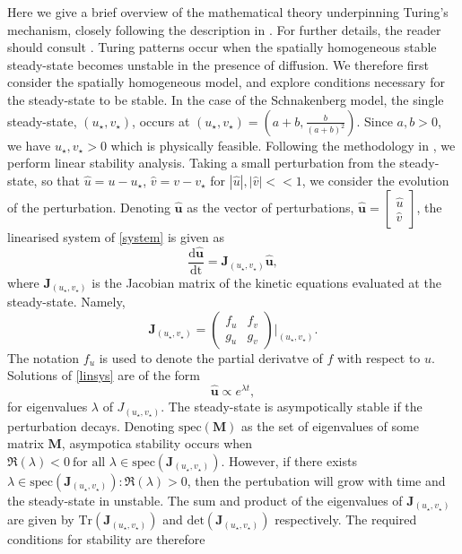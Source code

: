 \documentclass[12pt]{report}
\begin{document}
Here we give a brief overview of the mathematical theory underpinning Turing's mechanism, closely following the description in \cite{murray}. For further details, the reader should consult \cite{murray,beentjes}. Turing patterns occur when the spatially homogeneous stable steady-state becomes unstable in the presence of diffusion. We therefore first consider the spatially homogeneous model, and explore conditions necessary for the steady-state to be stable. In the case of the Schnakenberg model, the single steady-state, $(u_\star, v_\star)$, occurs at $(u_\star, v_\star)=\left(a+b, \frac{b}{(a+b)^2}\right)$. Since $a,b>0$, we have $u_\star,v_\star>0$ which is physically feasible. Following the methodology in \cite{murray}, we perform linear stability analysis. Taking a small perturbation from the steady-state, so that $\hat{u}=u-u_\star$, $\hat{v}=v-v_\star$ for $|\hat{u}|, |\hat{v}|<<1$, we consider the evolution of the perturbation. Denoting $\hat{\textbf{u}}$ as the vector of perturbations, $\hat{\textbf{u}}=\begin{bmatrix}\hat{u} \\ \hat{v}\end{bmatrix}$, the linearised system of \eqref{system} is given as
\begin{equation}\label{linsys}
\frac{\text{d}\hat{\textbf{u}}}{\text{dt}}=\textbf{J}_{(u_\star,v_\star)}\hat{\textbf{u}},
\end{equation}
where $\textbf{J}_{(u_\star,v_\star)}$ is the Jacobian matrix of the kinetic equations evaluated at the steady-state. Namely,
$$
\textbf{J}_{(u_\star,v_\star)}=\begin{pmatrix}f_u&f_v\\g_u&g_v\end{pmatrix}\Bigg|_{(u_\star,v_\star)}.
$$
The notation $f_u$ is used to denote the partial derivatve of $f$ with respect to $u$. Solutions of \eqref{linsys} are of the form
$$
\hat{\textbf{u}}\propto e^{\lambda t},
$$
for eigenvalues $\lambda$ of $J_{(u_\star,v_\star)}$. The steady-state is asympotically stable if the perturbation decays.
Denoting $\text{spec}(\textbf{M})$ as the set of eigenvalues of some matrix $\textbf{M}$, asympotica stability occurs when $\Re(\lambda)<0 \ \text{for all }\lambda\in \text{spec}(\textbf{J}_{(u_\star,v_\star)})$. However, if there exists $\lambda\in \text{spec}(\textbf{J}_{(u_\star,v_\star)}): \Re(\lambda)>0$,
then the pertubation will grow with time and the steady-state in unstable. The sum and product of the eigenvalues of $\textbf{J}_{(u_\star,v_\star)}$
are given by $\text{Tr}(\textbf{J}_{(u_\star,v_\star)})$ and $\text{det}(\textbf{J}_{(u_\star,v_\star)})$ respectively. The required conditions for stability are therefore
\end{document}
